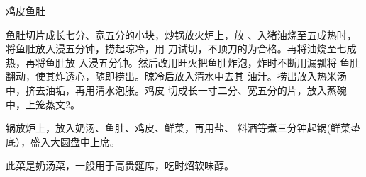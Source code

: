 \begin{recipe}{鸡皮鱼肚}

\ingredients


\cooking

\step 鱼肚切片成长七分、宽五分的小块，炒锅放火炉上，放 、入猪油烧至五成热时，将鱼肚放入浸五分钟，捞起晾冷，用 刀试切，不顶刀的为合格。再将油烧至七成热，再将鱼肚放 入浸五分钟。然后改用旺火把鱼肚炸泡，炸时不断用漏瓢将 鱼肚翻动，使其炸透心，随即捞出。晾冷后放入清水中去其 油汁。捞出放入热米汤中，挤去油垢，再用清水泡胀。鸡皮 切成长一寸二分、宽五分的片，放入蒸碗中，上笼蒸文2。

\step 锅放炉上，放入奶汤、鱼肚、鸡皮、鲜菜，再用盐、 料酒等煮三分钟起锅(鲜菜垫底），盛入大圆盘中上席。

\notes

此菜是奶汤菜，一般用于高贵筵席，吃时炤软味醇。

\end{recipe}

